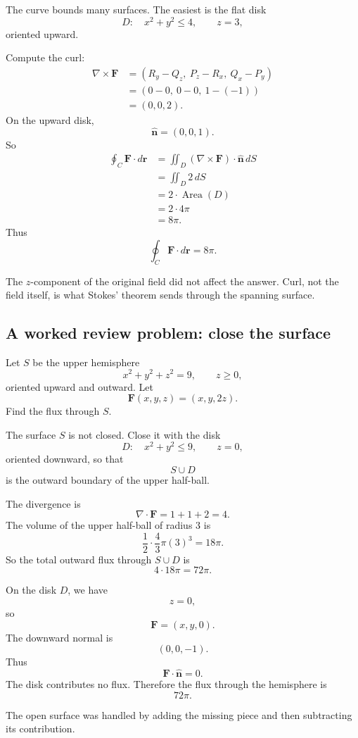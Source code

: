 The curve bounds many surfaces.  The easiest is the flat disk
\[
    D:\quad x^2+y^2\le4,\qquad z=3,
\]
oriented upward.

Compute the curl:
\[
\begin{aligned}
\nabla\times\mathbf F
&=
(R_y-Q_z,\ P_z-R_x,\ Q_x-P_y)\\
&=
(0-0,\ 0-0,\ 1-(-1))\\
&=
(0,0,2).
\end{aligned}
\]
On the upward disk,
\[
    \widehat{\mathbf n}=(0,0,1).
\]
So
\[
\begin{aligned}
\oint_C \mathbf F\cdot d\mathbf r
&=
\iint_D(\nabla\times\mathbf F)\cdot\widehat{\mathbf n}\,dS\\
&=
\iint_D 2\,dS\\
&=
2\cdot \operatorname{Area}(D)\\
&=
2\cdot4\pi\\
&=
8\pi.
\end{aligned}
\]
Thus
\[
\boxed{
    \oint_C \mathbf F\cdot d\mathbf r=8\pi.
}
\]

The \(z\)-component of the original field did not affect the answer.  Curl, not the
field itself, is what Stokes' theorem sends through the spanning surface.

\subsection{A worked review problem: close the surface}

Let \(S\) be the upper hemisphere
\[
    x^2+y^2+z^2=9,
    \qquad
    z\ge0,
\]
oriented upward and outward.  Let
\[
    \mathbf F(x,y,z)=(x,y,2z).
\]
Find the flux through \(S\).

The surface \(S\) is not closed.  Close it with the disk
\[
    D:\quad x^2+y^2\le9,\qquad z=0,
\]
oriented downward, so that
\[
    S\cup D
\]
is the outward boundary of the upper half-ball.

The divergence is
\[
    \nabla\cdot\mathbf F=1+1+2=4.
\]
The volume of the upper half-ball of radius \(3\) is
\[
    \frac12\cdot\frac43\pi(3)^3=18\pi.
\]
So the total outward flux through \(S\cup D\) is
\[
    4\cdot18\pi=72\pi.
\]

On the disk \(D\), we have
\[
    z=0,
\]
so
\[
    \mathbf F=(x,y,0).
\]
The downward normal is
\[
    (0,0,-1).
\]
Thus
\[
    \mathbf F\cdot\widehat{\mathbf n}=0.
\]
The disk contributes no flux.  Therefore the flux through the hemisphere is
\[
\boxed{
    72\pi.
}
\]

The open surface was handled by adding the missing piece and then subtracting its
contribution.

